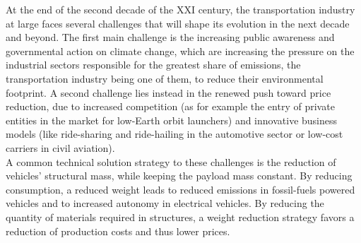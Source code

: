 At the end of the second decade of the XXI century, the transportation industry at large faces several challenges that will shape its evolution in the next decade and beyond. The first main challenge is the increasing public awareness and governmental action on climate change, which are increasing the pressure on the industrial sectors responsible for the greatest share of emissions, the transportation industry being one of them, to reduce their environmental footprint. A second challenge lies instead in the renewed push toward price reduction, due to increased competition (as for example the entry of private entities in the market for low-Earth orbit launchers) and innovative business models (like ride-sharing and ride-hailing in the automotive sector or low-cost carriers in civil aviation).\\
A common technical solution strategy to these challenges is the reduction of vehicles' structural mass, while keeping the payload mass constant. By reducing consumption, a reduced weight leads to reduced emissions in fossil-fuels powered vehicles and to increased autonomy in electrical vehicles. By reducing the quantity of materials required in structures, a weight reduction strategy favors a reduction of production costs and thus lower prices.  

